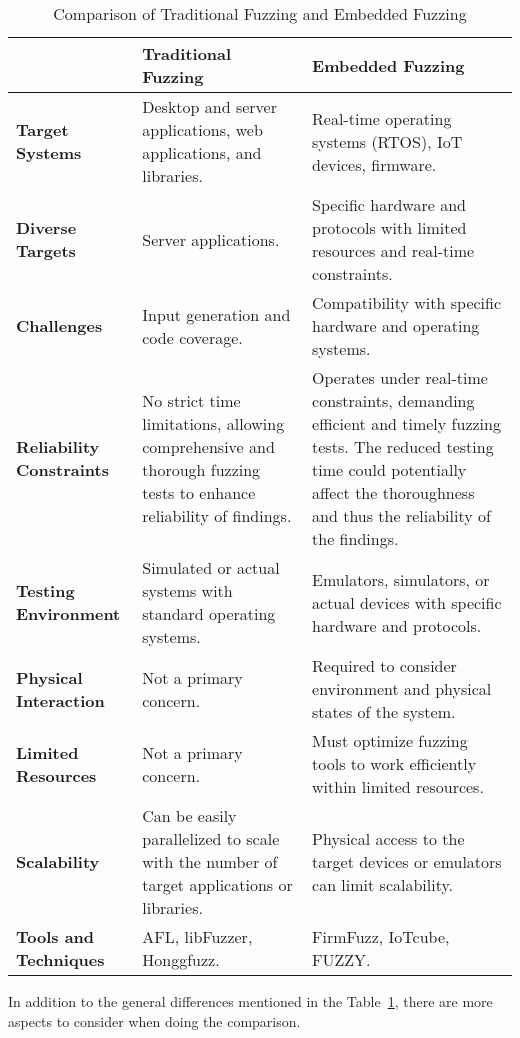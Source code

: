 \begin{table}[H]
\centering
\begin{tabularx}{\textwidth}{@{}>{\raggedright\arraybackslash}p{3cm}X X@{}}
\toprule
& \textbf{Traditional Fuzzing} & \textbf{Embedded Fuzzing} \\
\midrule
\textbf{Target Systems} & Desktop and server applications, web applications, and libraries. & Real-time operating systems (RTOS), IoT devices, firmware. \\
\addlinespace
\textbf{Diverse Targets} & Server applications. & Specific hardware and protocols with limited resources and real-time constraints. \\
\addlinespace
\textbf{Challenges} & Input generation and code coverage. & Compatibility with specific hardware and operating systems. \\
\addlinespace
\textbf{Reliability Constraints} & No strict time limitations, allowing comprehensive and thorough fuzzing tests to enhance reliability of findings. & Operates under real-time constraints, demanding efficient and timely fuzzing tests. The reduced testing time could potentially affect the thoroughness and thus the reliability of the findings. \\
\addlinespace
\textbf{Testing Environment} & Simulated or actual systems with standard operating systems. & Emulators, simulators, or actual devices with specific hardware and protocols. \\
\addlinespace
\textbf{Physical Interaction} & Not a primary concern. & Required to consider environment and physical states of the system. \\
\addlinespace
\textbf{Limited Resources} & Not a primary concern. & Must optimize fuzzing tools to work efficiently within limited resources. \\
\addlinespace
\textbf{Scalability} & Can be easily parallelized to scale with the number of target applications or libraries. & Physical access to the target devices or emulators can limit scalability. \\
\addlinespace
\textbf{Tools and Techniques} & AFL, libFuzzer, Honggfuzz. & FirmFuzz, IoTcube, FUZZY. \\
\bottomrule
\end{tabularx}
\caption{Comparison of Traditional Fuzzing and Embedded Fuzzing}
\label{tab:fuzzing_comparison}
\end{table}

In addition to the general differences mentioned in the Table~\ref{tab:fuzzing_comparison}, there are more aspects to consider
when doing the comparison.

